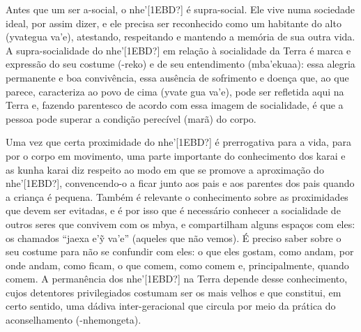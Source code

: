 \documentclass{article}
\begin{document}
Antes que um ser a-social, o nhe{\textquoteright}[1EBD?] \'e
supra-social. Ele vive numa sociedade ideal, por assim dizer, e ele
precisa ser reconhecido como um habitante do alto (yvategua
va{\textquoteright}e), atestando, respeitando e mantendo a mem\'oria de
sua outra vida. A supra-socialidade do nhe{\textquoteright}[1EBD?] em
rela\c{c}\~ao \`a socialidade da Terra \'e marca e express\~ao do seu
costume (-reko) e de seu entendimento (mba{\textquoteright}ekuaa): essa
alegria permanente e boa conviv\^encia, essa aus\^encia de sofrimento e
doen\c{c}a que, ao que parece, caracteriza ao povo de cima (yvate gua
va{\textquoteright}e), pode ser refletida aqui na Terra e, fazendo
parentesco de acordo com essa imagem de socialidade, \'e que a pessoa
pode superar a condi\c{c}\~ao perec\'ivel (mar\~a) do corpo.

Uma vez que certa proximidade do nhe{\textquoteright}[1EBD?] \'e
prerrogativa para a vida, para por o corpo em movimento, uma parte
importante do conhecimento dos karai e as kunha karai diz respeito ao
modo em que se promove a aproxima\c{c}\~ao do
nhe{\textquoteright}[1EBD?], convencendo-o a ficar junto aos pais e aos
parentes dos pais quando a crian\c{c}a \'e pequena. Tamb\'em \'e
relevante o conhecimento sobre as proximidades que devem ser evitadas,
e \'e por isso que \'e necess\'ario conhecer a socialidade de outros
seres que convivem com os mbya, e compartilham alguns espa\c{c}os com
eles: os chamados {\textquotedblleft}jaexa e{\textquoteright}\~{y}
va{\textquoteright}e{\textquotedblright} (aqueles que n\~ao vemos). \'E
preciso saber sobre o seu costume para n\~ao se confundir com eles: o
que eles gostam, como andam, por onde andam, como ficam, o que comem,
como comem e, principalmente, quando comem. A perman\^encia dos
nhe{\textquoteright}[1EBD?] na Terra depende desse conhecimento, cujos
detentores privilegiados costumam ser os mais velhos e que constitui,
em certo sentido, uma d\'adiva inter-geracional que circula por meio da
pr\'atica do aconselhamento ({}-nhemongeta).
\end{document}
